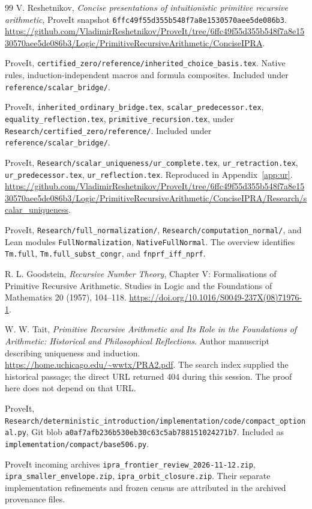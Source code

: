 \documentclass[11pt]{article}
\newcommand{\file}[1]{\nolinkurl{#1}}
\begin{document}
\clearpage

\begin{thebibliography}{99}
V. Reshetnikov, \emph{Concise presentations of intuitionistic primitive
recursive arithmetic}, ProveIt snapshot
\texttt{6ffc49f55d355b548f7a8e1530570aee5de086b3}.
\url{https://github.com/VladimirReshetnikov/ProveIt/tree/6ffc49f55d355b548f7a8e1530570aee5de086b3/Logic/PrimitiveRecursiveArithmetic/ConciseIPRA}.

ProveIt, \file{certified_zero/reference/inherited_choice_basis.tex}.
Native rules, induction-independent macros and formula composites.
Included under \file{reference/scalar_bridge/}.

ProveIt, \file{inherited_ordinary_bridge.tex}, \file{scalar_predecessor.tex},
\file{equality_reflection.tex}, \file{primitive_recursion.tex},
under \file{Research/certified_zero/reference/}.
Included under \file{reference/scalar_bridge/}.

ProveIt, \file{Research/scalar_uniqueness/ur_complete.tex},
\file{ur_retraction.tex}, \file{ur_predecessor.tex},
\file{ur_reflection.tex}. Reproduced in Appendix~\ref{app:ur}.
\url{https://github.com/VladimirReshetnikov/ProveIt/tree/6ffc49f55d355b548f7a8e1530570aee5de086b3/Logic/PrimitiveRecursiveArithmetic/ConciseIPRA/Research/scalar_uniqueness}.

ProveIt, \file{Research/full_normalization/},
\file{Research/computation_normal/}, and Lean modules
\file{FullNormalization}, \file{NativeFullNormal}.
The overview identifies \file{Tm.full}, \file{Tm.full_subst_congr},
and \file{fnprf_iff_nprf}.

R. L. Goodstein, \emph{Recursive Number Theory}, Chapter V:
Formalisations of Primitive Recursive Arithmetic.
Studies in Logic and the Foundations of Mathematics 20 (1957),
104--118. \url{https://doi.org/10.1016/S0049-237X(08)71976-1}.

W. W. Tait, \emph{Primitive Recursive Arithmetic and Its Role in the
Foundations of Arithmetic: Historical and Philosophical Reflections}.
Author manuscript describing uniqueness and induction.
\url{https://home.uchicago.edu/~wwtx/PRA2.pdf}.
The search index supplied the historical passage; the direct URL returned
404 during this session. The proof here does not depend on that URL.

ProveIt,
\file{Research/deterministic_introduction/implementation/code/compact_optional.py},
Git blob \texttt{a0af7afb236b530eb30c63c5ab788151024271b7}.
Included as \file{implementation/compact/base506.py}.

ProveIt incoming archives \file{ipra_frontier_review_2026-11-12.zip},
\file{ipra_smaller_envelope.zip}, \file{ipra_orbit_closure.zip}.
Their separate implementation refinements and frozen census are
attributed in the archived provenance files.
\end{thebibliography}


\end{document}
